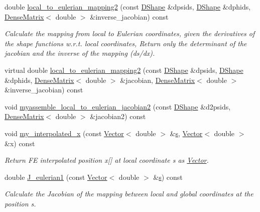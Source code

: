 \begin{DoxyCompactItemize}
double \hyperlink{classoomph_1_1C1CurvedElementBase_a8152ea7e16851b419f1036911f35dbee}{local\+\_\+to\+\_\+eulerian\+\_\+mapping2} (const \hyperlink{classoomph_1_1DShape}{D\+Shape} \&dpsids, \hyperlink{classoomph_1_1DShape}{D\+Shape} \&dphids, \hyperlink{classoomph_1_1DenseMatrix}{Dense\+Matrix}$<$ double $>$ \&inverse\+\_\+jacobian) const
\begin{DoxyCompactList}\small\item\em Calculate the mapping from local to Eulerian coordinates, given the derivatives of the shape functions w.\+r.\+t. local coordinates, Return only the determinant of the jacobian and the inverse of the mapping (ds/dx). \end{DoxyCompactList}\item 
virtual double \hyperlink{classoomph_1_1C1CurvedElementBase_a850d39886cc45f812ea16e4f10fcf930}{local\+\_\+to\+\_\+eulerian\+\_\+mapping2} (const \hyperlink{classoomph_1_1DShape}{D\+Shape} \&dpsids, \hyperlink{classoomph_1_1DShape}{D\+Shape} \&dphids, \hyperlink{classoomph_1_1DenseMatrix}{Dense\+Matrix}$<$ double $>$ \&jacobian, \hyperlink{classoomph_1_1DenseMatrix}{Dense\+Matrix}$<$ double $>$ \&inverse\+\_\+jacobian) const
\item 
void \hyperlink{classoomph_1_1C1CurvedElementBase_a5c56b56c6c246769b0b5fd3f20253ffe}{myassemble\+\_\+local\+\_\+to\+\_\+eulerian\+\_\+jacobian2} (const \hyperlink{classoomph_1_1DShape}{D\+Shape} \&d2psids, \hyperlink{classoomph_1_1DenseMatrix}{Dense\+Matrix}$<$ double $>$ \&jacobian2) const
\item 
void \hyperlink{classoomph_1_1C1CurvedElementBase_af16c55258f87849a452de6e38c13a366}{my\+\_\+interpolated\+\_\+x} (const \hyperlink{classoomph_1_1Vector}{Vector}$<$ double $>$ \&\hyperlink{cfortran_8h_ab7123126e4885ef647dd9c6e3807a21c}{s}, \hyperlink{classoomph_1_1Vector}{Vector}$<$ double $>$ \&x) const
\begin{DoxyCompactList}\small\item\em Return FE interpolated position x\mbox{[}\mbox{]} at local coordinate s as \hyperlink{classoomph_1_1Vector}{Vector}. \end{DoxyCompactList}\item 
double \hyperlink{classoomph_1_1C1CurvedElementBase_af8d7bb2e120f655629419f7627d95602}{J\+\_\+eulerian1} (const \hyperlink{classoomph_1_1Vector}{Vector}$<$ double $>$ \&\hyperlink{cfortran_8h_ab7123126e4885ef647dd9c6e3807a21c}{s}) const
\begin{DoxyCompactList}\small\item\em Calculate the Jacobian of the mapping between local and global coordinates at the position s. \end{DoxyCompactList}\item 

\end{DoxyCompactItemize}
